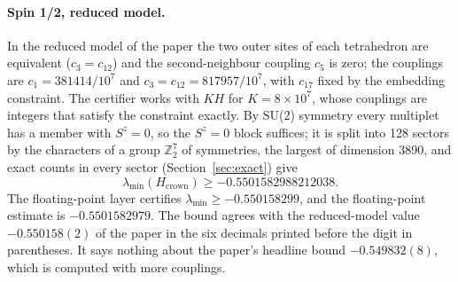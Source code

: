 \documentclass[11pt,a4paper]{article}
\begin{document}
\paragraph{Spin 1/2, reduced model.}
In the reduced model of the paper the two outer sites of each tetrahedron are equivalent ($c_3=c_{12}$) and the
second-neighbour coupling $c_5$ is zero; the couplings are $c_1=381414/10^7$ and $c_3=c_{12}=817957/10^7$, with $c_{17}$
fixed by the embedding constraint. The certifier works with $KH$ for $K=8\times10^7$, whose couplings are integers that
satisfy the constraint exactly. By SU(2) symmetry every multiplet has a member with $S^z=0$, so the $S^z=0$ block
suffices; it is split into 128 sectors by the characters of a group $\mathbb Z_2^7$ of symmetries, the largest of
dimension 3890, and exact counts in every sector (Section~\ref{sec:exact}) give
\begin{equation}
\lambda_{\min}(H_{\mathrm{crown}})\ge-0.5501582988212038.
\end{equation}
The floating-point layer certifies $\lambda_{\min}\ge-0.550158299$, and the floating-point estimate is
$-0.5501582979$. The bound agrees with the reduced-model value $-0.550158(2)$ of the paper in the six decimals printed
before the digit in parentheses. It says nothing about the paper's headline bound $-0.549832(8)$, which is computed
with more couplings.

\end{document}
